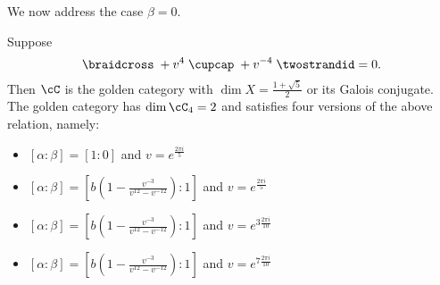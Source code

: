 \documentclass[12pt]{amsart}
\begin{document}
We now address the case $\beta = 0$.

\begin{lemma} \label{lem:betazero}
  Suppose
  \begin{equation}\label{eq:golden-rel}
    \braidcross \; + v^{4}\;\cupcap\; + v^{-4} \; \twostrandid = 0.
  \end{equation}
  Then $\cC$ is the golden category with $\dim X = \frac{1 + \sqrt{5}}{2}$ or its Galois conjugate.  The golden category has $\dim \cC_4 = 2$ and satisfies four versions of the above relation, namely:
 \begin{itemize}
 \item $[\alpha:\beta] = [1:0]$ and $v = e^{\frac{2 \pi i}{5}}$
  \item $[\alpha:\beta] = [b\left(1-\frac{v^{-3}}{v^{12}-v^{-12}}\right):1]$ and $v = e^{\frac{2 \pi i}{5}}$
 \item $[\alpha:\beta] = [b\left(1-\frac{v^{-3}}{v^{12}-v^{-12}}\right):1]$ and $v = e^{3 \frac{2 \pi i}{10}}$
 \item $[\alpha:\beta] = [b\left(1-\frac{v^{-3}}{v^{12}-v^{-12}}\right):1]$ and $v = e^{7 \frac{2 \pi i}{10}}$ 
 \end{itemize}
\end{lemma}
\end{document}
